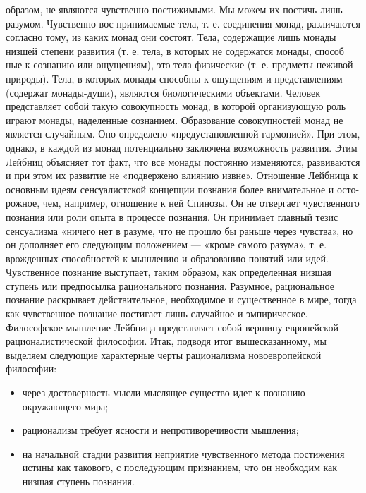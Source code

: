 \documentclass[12pt]{article}
\begin{document}
образом,  не  являются  чувственно  постижимыми.  Мы  можем  их  постичь  лишь  разумом.  Чувственно  вос-принимаемые тела, т. е. соединения монад, различаются согласно тому, из каких монад они состоят. Тела,
содержащие лишь монады низшей степени развития (т. е. тела, в которых не содержатся монады, способ ные к
сознанию или ощущениям),-это тела физические (т. е. предметы неживой природы). Тела, в которых монады
способны к ощущениям и представлениям (содержат монады-души), являются биологическими объектами.
Человек  представляет  собой  такую  совокупность  монад,  в  которой  организующую  роль  играют  монады,
наделенные  сознанием.  Образование  совокупностей  монад  не  является  случайным.  Оно  определено
«предустановленной гармонией». При этом, однако, в каждой из монад потенциально заключена возможность
развития. Этим Лейбниц объясняет тот факт, что все монады постоянно изменяются, развиваются и при этом их 
развитие не «подвержено влиянию извне».
Отношение Лейбница к основным идеям сенсуалистской концепции познания более внимательное и осто-рожное, чем, например, отношение к ней Спинозы. Он не отвергает чувственного познания или роли опыта в
процессе познания. Он принимает главный тезис сенсуализма «ничего нет в разуме, что не прошло бы раньше
через чувства», но он дополняет его следующим положением --- «кроме самого разума», т. е. врожденных
способностей к мышлению и образованию понятий или идей.
Чувственное  познание  выступает,  таким  образом,  как  определенная  низшая  ступень  или  предпосылка
рационального  познания.  Разумное,  рациональное  познание  раскрывает  действительное,  необходимое  и
существенное в мире, тогда как чувственное познание постигает лишь случайное и эмпирическое.
Философское мышление Лейбница представляет собой вершину европейской рационалистической философии.
Итак,  подводя  итог  вышесказанному,  мы  выделяем  следующие  характерные  черты  рационализма
новоевропейской философии:
\begin{itemize}
  \item через достоверность мысли мыслящее существо идет к познанию окружающего мира;
  \item рационализм требует ясности и непротиворечивости мышления;
  \item  на  начальной  стадии  развития  неприятие  чувственного  метода  постижения  истины  как  такового,  с
последующим признанием, что он необходим как низшая ступень познания.
\end{itemize}


\newpage
\end{document}
